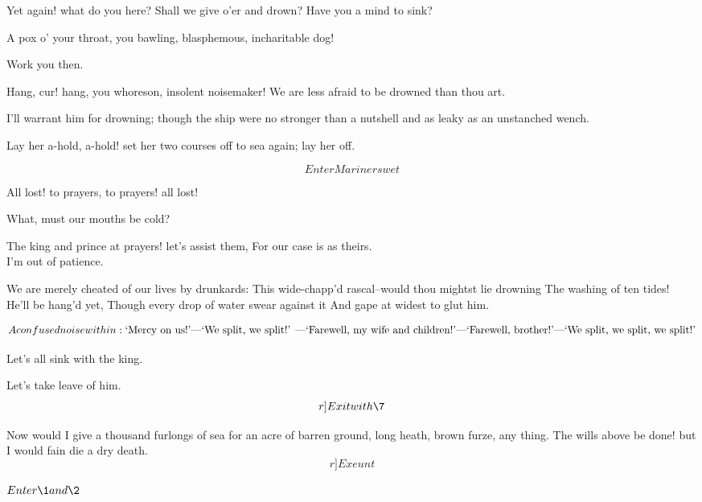 \documentclass[11pt]{book}
\begin{document}
\begin{PROSE}
	Yet again! what do you here? Shall we give o'er
	and drown? Have you a mind to sink?


\8	A pox o' your throat, you bawling, blasphemous,
	incharitable dog!

	Work you then.

\7	Hang, cur! hang, you whoreson, insolent noisemaker!
	We are less afraid to be drowned than thou art.

\9	I'll warrant him for drowning; though the ship were
	no stronger than a nutshell and as leaky as an
	unstanched wench.

	Lay her a-hold, a-hold! set her two courses off to
	sea again; lay her off.

	\[Enter Mariners wet\]

	All lost! to prayers, to prayers! all lost!

	What, must our mouths be cold?

\end{PROSE}



\9	The king and prince at prayers! let's assist them,
	For our case is as theirs. \\


\8	I'm out of patience.


\7	We are merely cheated of our lives by drunkards:
	This wide-chapp'd rascal--would thou mightst lie drowning
	The washing of ten tides! \\

\9	He'll be hang'd yet,
	Though every drop of water swear against it
	And gape at widest to glut him.

	\[A confused noise within: \textup{`Mercy on us!'---%
	`We split, we split!' ---`Farewell, my wife and children!'---%
	`Farewell, brother!'---`We split, we split, we split!'}\]

\begin{PROSE}

\7	Let's all sink with the king.  

\8	Let's take leave of him.  \[r]Exit with \7\]


\9	Now would I give a thousand furlongs of sea for an
	acre of barren ground, long heath, brown furze, any
	thing. The wills above be done! but I would fain
	die a dry death.  \[r]Exeunt\]

\end{PROSE}



       \(Enter \1 and \2\) 
\end{document}
